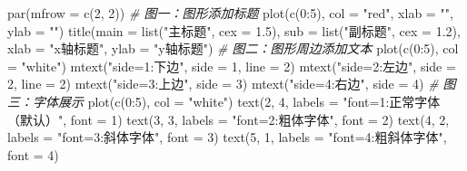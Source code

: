 \documentclass[
]{book}
\newenvironment{Shaded}{\begin{snugshade}}{\end{snugshade}}
\newcommand{\AttributeTok}[1]{\textcolor[rgb]{0.77,0.63,0.00}{#1}}
\newcommand{\CommentTok}[1]{\textcolor[rgb]{0.56,0.35,0.01}{\textit{#1}}}
\newcommand{\DecValTok}[1]{\textcolor[rgb]{0.00,0.00,0.81}{#1}}
\newcommand{\FloatTok}[1]{\textcolor[rgb]{0.00,0.00,0.81}{#1}}
\newcommand{\FunctionTok}[1]{\textcolor[rgb]{0.00,0.00,0.00}{#1}}
\newcommand{\NormalTok}[1]{#1}
\newcommand{\SpecialCharTok}[1]{\textcolor[rgb]{0.00,0.00,0.00}{#1}}
\newcommand{\StringTok}[1]{\textcolor[rgb]{0.31,0.60,0.02}{#1}}
\begin{document}
\begin{Shaded}
\begin{Highlighting}[]
\FunctionTok{par}\NormalTok{(}\AttributeTok{mfrow =} \FunctionTok{c}\NormalTok{(}\DecValTok{2}\NormalTok{, }\DecValTok{2}\NormalTok{))}
\CommentTok{\# 图一：图形添加标题}
\FunctionTok{plot}\NormalTok{(}\FunctionTok{c}\NormalTok{(}\DecValTok{0}\SpecialCharTok{:}\DecValTok{5}\NormalTok{), }\AttributeTok{col =} \StringTok{"red"}\NormalTok{, }\AttributeTok{xlab =} \StringTok{""}\NormalTok{, }\AttributeTok{ylab =} \StringTok{""}\NormalTok{)}
\FunctionTok{title}\NormalTok{(}\AttributeTok{main =} \FunctionTok{list}\NormalTok{(}\StringTok{"主标题"}\NormalTok{, }\AttributeTok{cex =} \FloatTok{1.5}\NormalTok{), }\AttributeTok{sub =} \FunctionTok{list}\NormalTok{(}\StringTok{"副标题"}\NormalTok{, }\AttributeTok{cex =} \FloatTok{1.2}\NormalTok{), }\AttributeTok{xlab =} \StringTok{"x轴标题"}\NormalTok{, }
    \AttributeTok{ylab =} \StringTok{"y轴标题"}\NormalTok{)}
\CommentTok{\# 图二：图形周边添加文本}
\FunctionTok{plot}\NormalTok{(}\FunctionTok{c}\NormalTok{(}\DecValTok{0}\SpecialCharTok{:}\DecValTok{5}\NormalTok{), }\AttributeTok{col =} \StringTok{"white"}\NormalTok{)}
\FunctionTok{mtext}\NormalTok{(}\StringTok{"side=1:下边"}\NormalTok{, }\AttributeTok{side =} \DecValTok{1}\NormalTok{, }\AttributeTok{line =} \DecValTok{2}\NormalTok{)}
\FunctionTok{mtext}\NormalTok{(}\StringTok{"side=2:左边"}\NormalTok{, }\AttributeTok{side =} \DecValTok{2}\NormalTok{, }\AttributeTok{line =} \DecValTok{2}\NormalTok{)}
\FunctionTok{mtext}\NormalTok{(}\StringTok{"side=3:上边"}\NormalTok{, }\AttributeTok{side =} \DecValTok{3}\NormalTok{)}
\FunctionTok{mtext}\NormalTok{(}\StringTok{"side=4:右边"}\NormalTok{, }\AttributeTok{side =} \DecValTok{4}\NormalTok{)}
\CommentTok{\# 图三：字体展示}
\FunctionTok{plot}\NormalTok{(}\FunctionTok{c}\NormalTok{(}\DecValTok{0}\SpecialCharTok{:}\DecValTok{5}\NormalTok{), }\AttributeTok{col =} \StringTok{"white"}\NormalTok{)}
\FunctionTok{text}\NormalTok{(}\DecValTok{2}\NormalTok{, }\DecValTok{4}\NormalTok{, }\AttributeTok{labels =} \StringTok{"font=1:正常字体（默认）"}\NormalTok{, }\AttributeTok{font =} \DecValTok{1}\NormalTok{)}
\FunctionTok{text}\NormalTok{(}\DecValTok{3}\NormalTok{, }\DecValTok{3}\NormalTok{, }\AttributeTok{labels =} \StringTok{"font=2:粗体字体"}\NormalTok{, }\AttributeTok{font =} \DecValTok{2}\NormalTok{)}
\FunctionTok{text}\NormalTok{(}\DecValTok{4}\NormalTok{, }\DecValTok{2}\NormalTok{, }\AttributeTok{labels =} \StringTok{"font=3:斜体字体"}\NormalTok{, }\AttributeTok{font =} \DecValTok{3}\NormalTok{)}
\FunctionTok{text}\NormalTok{(}\DecValTok{5}\NormalTok{, }\DecValTok{1}\NormalTok{, }\AttributeTok{labels =} \StringTok{"font=4:粗斜体字体"}\NormalTok{, }\AttributeTok{font =} \DecValTok{4}\NormalTok{)}

\end{Highlighting}
\end{Shaded}
\end{document}
